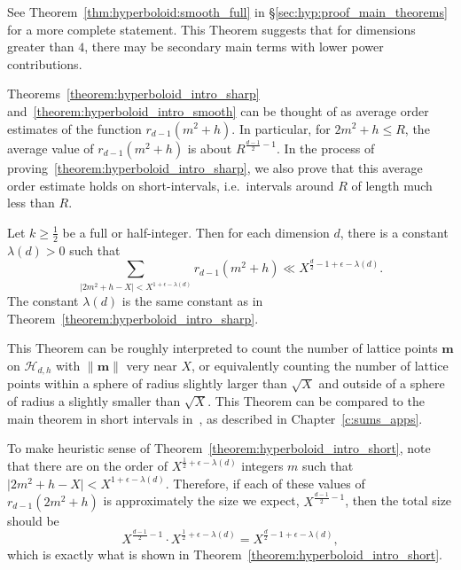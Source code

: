 See Theorem~\ref{thm:hyperboloid:smooth_full} in \S\ref{sec:hyp:proof_main_theorems} for a
more complete statement.
This Theorem suggests that for dimensions greater than $4$, there may be secondary main
terms with lower power contributions.


Theorems~\ref{theorem:hyperboloid_intro_sharp} and~\ref{theorem:hyperboloid_intro_smooth}
can be thought of as average order estimates of the function $r_{d-1}(m^2+h)$.
In particular, for $2m^2 + h \leq R$, the average value of $r_{d-1}(m^2+h)$ is about
$R^{\frac{d-1}{2}-1}$.
In the process of proving~\ref{theorem:hyperboloid_intro_sharp}, we also prove
that this average order estimate holds on short-intervals, i.e.\ intervals
around $R$ of length much less than $R$.


\begin{theorem}\label{theorem:hyperboloid_intro_short}
  Let $k \geq \frac{1}{2}$ be a full or half-integer.
  Then for each dimension $d$, there is a constant $\lambda(d) > 0$ such that
  \begin{equation}
    \sum_{\lvert 2m^2 + h - X \rvert < X^{1 + \epsilon - \lambda(d)}} r_{d-1}(m^2 + h) \ll
    X^{\frac{d}{2} - 1 + \epsilon - \lambda(d)}.
  \end{equation}
  The constant $\lambda(d)$ is the same constant as in
  Theorem~\ref{theorem:hyperboloid_intro_sharp}.
\end{theorem}


This Theorem can be roughly interpreted to count the number of lattice points $\bm{m}$ on
$\mathcal{H}_{d,h}$ with $\| \bm{m} \|$ very near $X$, or equivalently counting the number
of lattice points within a sphere of radius slightly larger than $\sqrt X$ and outside of
a sphere of radius a slightly smaller than $\sqrt X$.
This Theorem can be compared to the main theorem in short intervals
in~\cite{hkldwShort}, as described in Chapter~\ref{c:sums_apps}.


\begin{remark}
  To make heuristic sense of Theorem~\ref{theorem:hyperboloid_intro_short}, note that
  there are on the order of $X^{\frac{1}{2} + \epsilon - \lambda(d)}$ integers $m$ such
  that $\lvert 2m^2 + h - X \rvert < X^{1 + \epsilon - \lambda(d)}$.
  Therefore, if each of these values of $r_{d-1}(2m^2 + h)$ is approximately the size we
  expect, $X^{\frac{d-1}{2} - 1}$, then the total size should be
  \begin{equation}
    X^{\frac{d-1}{2} - 1} \cdot X^{\frac{1}{2} + \epsilon - \lambda(d)} = X^{\frac{d}{2} -
    1 + \epsilon - \lambda(d)},
  \end{equation}
  which is exactly what is shown in Theorem~\ref{theorem:hyperboloid_intro_short}.
\end{remark}




